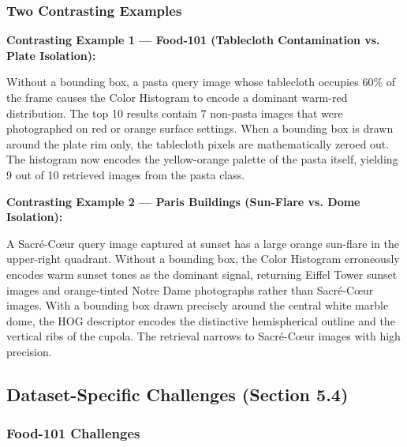\documentclass[11pt, a4paper]{article}
\begin{document}
\subsubsection{Two Contrasting Examples}

\textbf{Contrasting Example 1 — Food-101 (Tablecloth Contamination vs. Plate Isolation):}

Without a bounding box, a pasta query image whose tablecloth occupies 60\% of the frame causes the Color Histogram to encode a dominant warm-red distribution. The top 10 results contain 7 non-pasta images that were photographed on red or orange surface settings. When a bounding box is drawn around the plate rim only, the tablecloth pixels are mathematically zeroed out. The histogram now encodes the yellow-orange palette of the pasta itself, yielding 9 out of 10 retrieved images from the pasta class.

\textbf{Contrasting Example 2 — Paris Buildings (Sun-Flare vs. Dome Isolation):}

A Sacré-Cœur query image captured at sunset has a large orange sun-flare in the upper-right quadrant. Without a bounding box, the Color Histogram erroneously encodes warm sunset tones as the dominant signal, returning Eiffel Tower sunset images and orange-tinted Notre Dame photographs rather than Sacré-Cœur images. With a bounding box drawn precisely around the central white marble dome, the HOG descriptor encodes the distinctive hemispherical outline and the vertical ribs of the cupola. The retrieval narrows to Sacré-Cœur images with high precision.

\subsection{Dataset-Specific Challenges (Section 5.4)}

\subsubsection{Food-101 Challenges}
\end{document}
